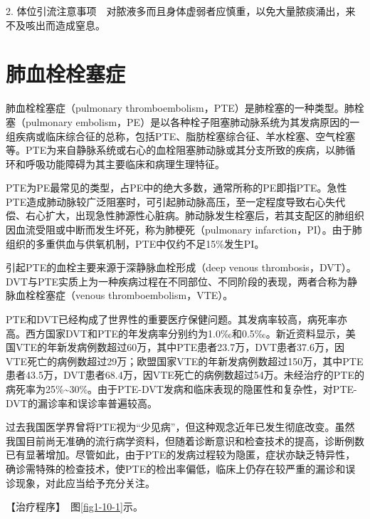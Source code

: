 2.
体位引流注意事项　对脓液多而且身体虚弱者应慎重，以免大量脓痰涌出，来不及咳出而造成窒息。

\section{肺血栓栓塞症}

肺血栓栓塞症（pulmonary
thromboembolism，PTE）是肺栓塞的一种类型。肺栓塞（pulmonary
embolism，PE）是以各种栓子阻塞肺动脉系统为其发病原因的一组疾病或临床综合征的总称，包括PTE、脂肪栓塞综合征、羊水栓塞、空气栓塞等。PTE为来自静脉系统或右心的血栓阻塞肺动脉或其分支所致的疾病，以肺循环和呼吸功能障碍为其主要临床和病理生理特征。

PTE为PE最常见的类型，占PE中的绝大多数，通常所称的PE即指PTE。急性PTE造成肺动脉较广泛阻塞时，可引起肺动脉高压，至一定程度导致右心失代偿、右心扩大，出现急性肺源性心脏病。肺动脉发生栓塞后，若其支配区的肺组织因血流受阻或中断而发生坏死，称为肺梗死（pulmonary
infarction，PI）。由于肺组织的多重供血与供氧机制，PTE中仅约不足15\%发生PI。

引起PTE的血栓主要来源于深静脉血栓形成（deep venous
thrombosis，DVT）。DVT与PTE实质上为一种疾病过程在不同部位、不同阶段的表现，两者合称为静脉血栓栓塞症（venous
thromboembolism，VTE）。

PTE和DVT已经构成了世界性的重要医疗保健问题。其发病率较高，病死率亦高。西方国家DVT和PTE的年发病率分别约为1.0‰和0.5‰。新近资料显示，美国VTE的年新发病例数超过60万，其中PTE患者23.7万，DVT患者37.6万，因VTE死亡的病例数超过29万；欧盟国家VTE的年新发病例数超过150万，其中PTE患者43.5万，DVT患者68.4万，因VTE死亡的病例数超过54万。未经治疗的PTE的病死率为25\%\textasciitilde{}30\%。由于PTE-DVT发病和临床表现的隐匿性和复杂性，对PTE-DVT的漏诊率和误诊率普遍较高。

过去我国医学界曾将PTE视为“少见病”，但这种观念近年已发生彻底改变。虽然我国目前尚无准确的流行病学资料，但随着诊断意识和检查技术的提高，诊断例数已有显著增加。尽管如此，由于PTE的发病过程较为隐匿，症状亦缺乏特异性，确诊需特殊的检查技术，使PTE的检出率偏低，临床上仍存在较严重的漏诊和误诊现象，对此应当给予充分关注。

【治疗程序】　图\ref{fig1-10-1}示。

